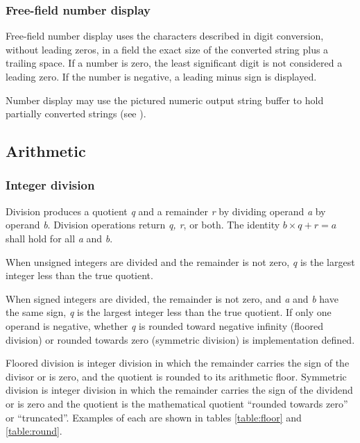 \subsubsection{Free-field number display} %
\label{usage:dot}

Free-field number display uses the characters described in digit
conversion, without leading zeros, in a field the exact size of
the converted string plus a trailing space. If a number is zero,
the least significant digit is not considered a leading zero. If
the number is negative, a leading minus sign is displayed.

Number display may use the pictured numeric output string buffer
to hold partially converted strings (see ).

\subsection{Arithmetic} %

\subsubsection{Integer division} %
\label{usage:div}

Division produces a quotient \emph{q} and a remainder \emph{r}
by dividing operand \emph{a} by operand \emph{b}. Division
operations return \emph{q, r}, or both. The identity
$b \times q + r = a$ shall hold for all \emph{a} and \emph{b}.

When unsigned integers are divided and the remainder is not zero,
\emph{q} is the largest integer less than the true quotient.

When signed integers are divided, the remainder is not zero, and
\emph{a} and \emph{b} have the same sign, \emph{q} is the largest
integer less than the true quotient. If only one operand is
negative, whether \emph{q} is rounded toward negative infinity
(floored division) or rounded towards zero (symmetric division) is
implementation defined.

Floored division is integer division in which the remainder carries
the sign of the divisor or is zero, and the quotient is rounded to
its arithmetic floor. Symmetric division is integer division in
which the remainder carries the sign of the dividend or is zero and
the quotient is the mathematical quotient ``rounded towards zero''
or ``truncated''. Examples of each are shown in tables
\ref{table:floor} and \ref{table:round}.

